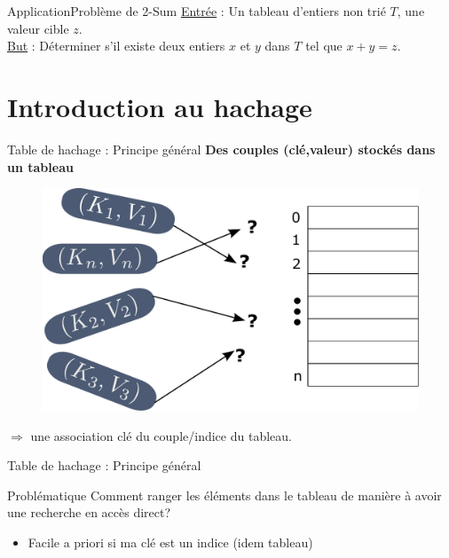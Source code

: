\documentclass[12pt,a4paper]{beamer}
\begin{document}
\begin{frame}[t]{Application}{Problème de 2-Sum}
\underline{Entrée} : Un tableau d'entiers non trié $T$, une valeur cible $z$.\\
\underline{But} : Déterminer s'il existe deux entiers $x$ et $y$ dans $T$ tel que $x + y = z$.
\end{frame}



\begin{frame}
\tableofcontents
\end{frame}

\section{Introduction au hachage}


\begin{frame}{Table de hachage : Principe général}
\centering \textbf{Des couples (clé,valeur) stockés dans un tableau}
\begin{block}{}
\begin{figure}
\includegraphics[scale=0.3]{figs/ht_global}
\end{figure}
\end{block}
\pause
$\Rightarrow$ une association clé du couple/indice du tableau.
\end{frame}

\begin{frame}{Table de hachage : Principe général}

\begin{block}{Problématique}
Comment ranger les éléments dans le tableau de manière à avoir une recherche en accès direct?
\end{block}
\pause
\begin{itemize}
\item Facile a priori si ma clé est un indice (idem tableau) 
\end{itemize}


\end{frame}
\end{document}
